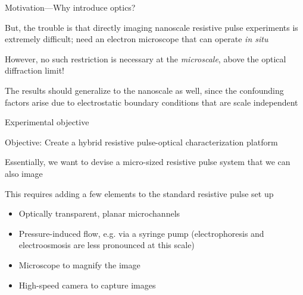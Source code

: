 

\begin{frame}[c]{Motivation---Why introduce optics?}
	
	But, the trouble is that directly imaging nanoscale resistive pulse experiments is extremely difficult; need an electron microscope that can operate \textit{in situ}
	
	\vspace{.2in}
	
	However, no such restriction is necessary at the \textit{microscale}, above the optical diffraction limit!
	
	\vspace{.2in}
	
	The results should generalize to the nanoscale as well, since the confounding factors arise due to electrostatic boundary conditions that are scale independent
	
	\vspace{.2in}
	

\end{frame}




\begin{frame}[c]{Experimental objective}

	\textcolor{negativered}{Objective: Create a hybrid resistive pulse-optical characterization platform} \\
	
	\vspace{.1in}
	
	Essentially, we want to devise a micro-sized resistive pulse system that we can also image \\
	
	\vspace{.1in}
	
	This requires adding a few elements to the standard resistive pulse set up
	
	\begin{itemize}
		\item Optically transparent, planar microchannels
		\item Pressure-induced flow, e.g. via a syringe pump (electrophoresis and electroosmosis are less pronounced at this scale)
		\item Microscope to magnify the image
		\item High-speed camera to capture images
	\end{itemize}

	
	

\end{frame}


